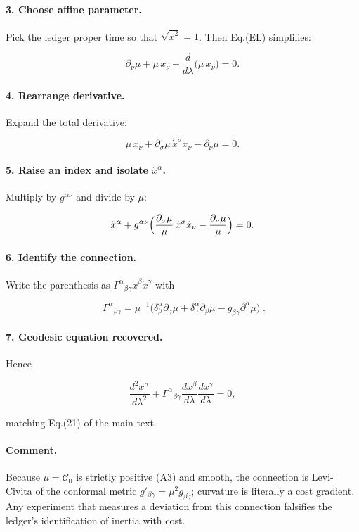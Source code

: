 \documentclass[11pt]{article}
\begin{document}
\paragraph{3. Choose affine parameter.}
Pick the ledger proper time so that \(\sqrt{\dot x^{2}}=1\).
Then Eq.​(EL) simplifies:

\[
\partial_{\nu}\mu
+\mu\,\dot x_{\nu}
-\frac{d}{d\lambda}\!\bigl(\mu\,\dot x_{\nu}\bigr)=0.
\]

\paragraph{4. Rearrange derivative.}
Expand the total derivative:

\[
\mu\,\ddot x_{\nu}
+\partial_{\sigma}\mu\,\dot x^{\sigma}\dot x_{\nu}
-\partial_{\nu}\mu=0.
\]

\paragraph{5. Raise an index and isolate \(\ddot x^{\alpha}\).}
Multiply by \(g^{\alpha\nu}\) and divide by \(\mu\):

\[
\ddot x^{\alpha}
+g^{\alpha\nu}
  \Bigl(\frac{\partial_{\sigma}\mu}{\mu}\,\dot x^{\sigma}\dot x_{\nu}
        -\frac{\partial_{\nu}\mu}{\mu}\Bigr)=0.
\]

\paragraph{6. Identify the connection.}
Write the parenthesis as
\(\Gamma^{\alpha}{}_{\beta\gamma}\dot x^{\beta}\dot x^{\gamma}\) with

\[
\boxed{\;
\Gamma^{\alpha}{}_{\beta\gamma}
     =\mu^{-1}\!
       \bigl(
         \delta^{\alpha}_{\beta}\partial_{\gamma}\mu
        +\delta^{\alpha}_{\gamma}\partial_{\beta}\mu
        -g_{\beta\gamma}\partial^{\alpha}\mu
       \bigr)
\;} .
\]

\paragraph{7. Geodesic equation recovered.}
Hence

\[
\frac{d^{2}x^{\alpha}}{d\lambda^{2}}
+\Gamma^{\alpha}{}_{\beta\gamma}
  \frac{dx^{\beta}}{d\lambda}
  \frac{dx^{\gamma}}{d\lambda}
=0,
\]

matching Eq.​(21) of the main text.

\paragraph{Comment.}
Because \(\mu=\mathcal{C}_{0}\) is strictly positive (A3) and smooth, the
connection is Levi-Civita of the conformal metric
\(g'_{\beta\gamma}=\mu^{2}g_{\beta\gamma}\); curvature is literally a
cost gradient.  Any experiment that measures a deviation from this
connection falsifies the ledger’s identification of inertia with cost.
\end{document}

